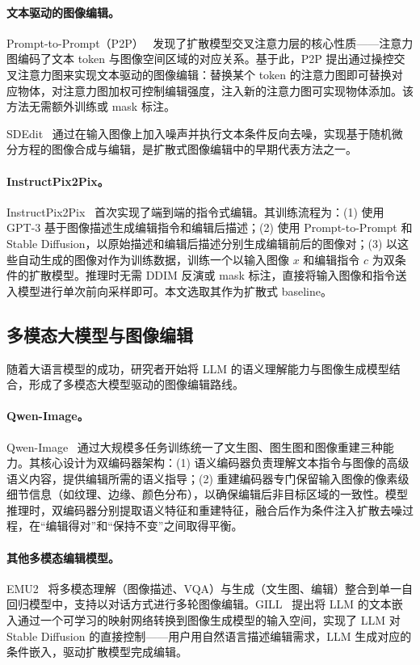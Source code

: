 \documentclass[UTF8,11pt,a4paper,fontset=fandol]{ctexart}
\begin{document}
\paragraph{文本驱动的图像编辑。}
Prompt-to-Prompt（P2P）~\cite{p2p} 发现了扩散模型交叉注意力层的核心性质——注意力图编码了文本 token 与图像空间区域的对应关系。基于此，P2P 提出通过操控交叉注意力图来实现文本驱动的图像编辑：替换某个 token 的注意力图即可替换对应物体，对注意力图加权可控制编辑强度，注入新的注意力图可实现物体添加。该方法无需额外训练或 mask 标注。

SDEdit~\cite{sdedit} 通过在输入图像上加入噪声并执行文本条件反向去噪，实现基于随机微分方程的图像合成与编辑，是扩散式图像编辑中的早期代表方法之一。

\paragraph{InstructPix2Pix。}
InstructPix2Pix~\cite{instructpix2pix} 首次实现了端到端的指令式编辑。其训练流程为：(1) 使用 GPT-3 基于图像描述生成编辑指令和编辑后描述；(2) 使用 Prompt-to-Prompt 和 Stable Diffusion，以原始描述和编辑后描述分别生成编辑前后的图像对；(3) 以这些自动生成的图像对作为训练数据，训练一个以输入图像 $x$ 和编辑指令 $c$ 为双条件的扩散模型。推理时无需 DDIM 反演或 mask 标注，直接将输入图像和指令送入模型进行单次前向采样即可。本文选取其作为扩散式 baseline。

\subsection{多模态大模型与图像编辑}

随着大语言模型的成功，研究者开始将 LLM 的语义理解能力与图像生成模型结合，形成了多模态大模型驱动的图像编辑路线。

\paragraph{Qwen-Image。}
Qwen-Image~\cite{qwenimage} 通过大规模多任务训练统一了文生图、图生图和图像重建三种能力。其核心设计为双编码器架构：(1) 语义编码器负责理解文本指令与图像的高级语义内容，提供编辑所需的语义指导；(2) 重建编码器专门保留输入图像的像素级细节信息（如纹理、边缘、颜色分布），以确保编辑后非目标区域的一致性。模型推理时，双编码器分别提取语义特征和重建特征，融合后作为条件注入扩散去噪过程，在“编辑得对”和“保持不变”之间取得平衡。

\paragraph{其他多模态编辑模型。}
EMU2~\cite{emu2} 将多模态理解（图像描述、VQA）与生成（文生图、编辑）整合到单一自回归模型中，支持以对话方式进行多轮图像编辑。GILL~\cite{gill} 提出将 LLM 的文本嵌入通过一个可学习的映射网络转换到图像生成模型的输入空间，实现了 LLM 对 Stable Diffusion 的直接控制——用户用自然语言描述编辑需求，LLM 生成对应的条件嵌入，驱动扩散模型完成编辑。
\end{document}
